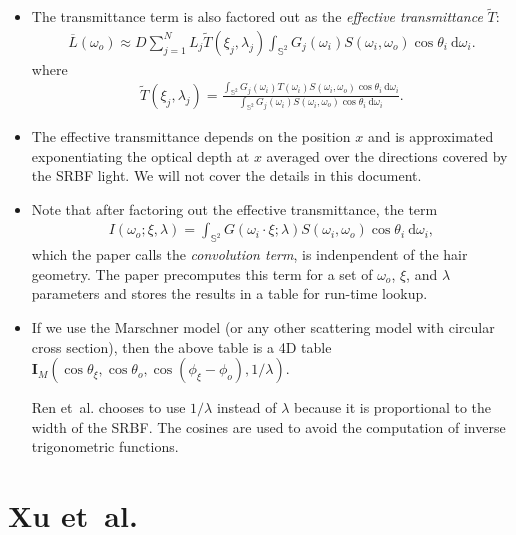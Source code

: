 \documentclass[10pt]{article}
\newcommand{\dee}{\mathrm{d}}
\newcommand{\etal}{{et~al.}}
\begin{document}
\begin{itemize}
    \item The transmittance term is also factored out as the \emph{effective transmittance} $\widetilde{T}$:
    \begin{align*}
      \overline{L}(\omega_o) \approx D \sum_{j=1}^N L_j \widetilde{T}(\xi_j, \lambda_j) \int_{\mathbb{S}^2} G_j(\omega_i) S(\omega_i, \omega_o)\cos \theta_i\ \dee\omega_i.
    \end{align*}
    where
    \begin{align*}
      \widetilde{T}(\xi_j, \lambda_j) = \frac{\int_{\mathbb{S}^2} G_j(\omega_i) T(\omega_i) S(\omega_i, \omega_o) \cos \theta_i\ \dee \omega_i}{\int_{\mathbb{S}^2} G_j(\omega_i) S(\omega_i, \omega_o) \cos \theta_i\ \dee \omega_i}.
    \end{align*}

    \item The effective transmittance depends on the position $x$ and is approximated exponentiating the optical depth at $x$ averaged over the directions covered by the SRBF light. We will not cover the details in this document.
    
    \item Note that after factoring out the effective transmittance, the term
    \begin{align*}
      I(\omega_o; \xi, \lambda) = \int_{\mathbb{S}^2} G(\omega_i \cdot \xi; \lambda) S(\omega_i, \omega_o) \cos \theta_i\ \dee\omega_i,
    \end{align*}
which the paper calls the \emph{convolution term}, is indenpendent of the hair geometry. The paper precomputes this term for a set of $\omega_o$, $\xi$, and $\lambda$ parameters and stores the results in a table for run-time lookup.
    
    \item If we use the Marschner model (or any other scattering model with circular cross section), then the above table is a 4D table $\mathbf{I}_M(\cos \theta_\xi, \cos \theta_o, \cos(\phi_\xi - \phi_o), 1/\lambda)$. 
    
    Ren et~al. chooses to use $1/\lambda$ instead of $\lambda$ because it is proportional to the width of the SRBF. The cosines are used to avoid the computation of inverse trigonometric functions.
  \end{itemize}
  
  \section{Xu \etal~\cite{Xu:2011}}
  
\end{document}
